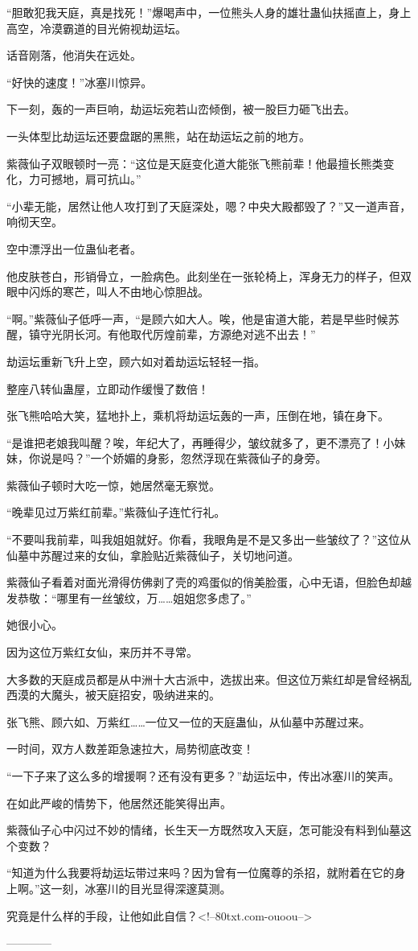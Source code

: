 \begin{this_body}
“胆敢犯我天庭，真是找死！”爆喝声中，一位熊头人身的雄壮蛊仙扶摇直上，身上高空，冷漠霸道的目光俯视劫运坛。

话音刚落，他消失在远处。

“好快的速度！”冰塞川惊异。

下一刻，轰的一声巨响，劫运坛宛若山峦倾倒，被一股巨力砸飞出去。

一头体型比劫运坛还要盘踞的黑熊，站在劫运坛之前的地方。

紫薇仙子双眼顿时一亮：“这位是天庭变化道大能张飞熊前辈！他最擅长熊类变化，力可撼地，肩可抗山。”

“小辈无能，居然让他人攻打到了天庭深处，嗯？中央大殿都毁了？”又一道声音，响彻天空。

空中漂浮出一位蛊仙老者。

他皮肤苍白，形销骨立，一脸病色。此刻坐在一张轮椅上，浑身无力的样子，但双眼中闪烁的寒芒，叫人不由地心惊胆战。

“啊。”紫薇仙子低呼一声，“是顾六如大人。唉，他是宙道大能，若是早些时候苏醒，镇守光阴长河。有他取代厉煌前辈，方源绝对逃不出去！”

劫运坛重新飞升上空，顾六如对着劫运坛轻轻一指。

整座八转仙蛊屋，立即动作缓慢了数倍！

张飞熊哈哈大笑，猛地扑上，乘机将劫运坛轰的一声，压倒在地，镇在身下。

“是谁把老娘我叫醒？唉，年纪大了，再睡得少，皱纹就多了，更不漂亮了！小妹妹，你说是吗？”一个娇媚的身影，忽然浮现在紫薇仙子的身旁。

紫薇仙子顿时大吃一惊，她居然毫无察觉。

“晚辈见过万紫红前辈。”紫薇仙子连忙行礼。

“不要叫我前辈，叫我姐姐就好。你看，我眼角是不是又多出一些皱纹了？”这位从仙墓中苏醒过来的女仙，拿脸贴近紫薇仙子，关切地问道。

紫薇仙子看着对面光滑得仿佛剥了壳的鸡蛋似的俏美脸蛋，心中无语，但脸色却越发恭敬：“哪里有一丝皱纹，万……姐姐您多虑了。”

她很小心。

因为这位万紫红女仙，来历并不寻常。

大多数的天庭成员都是从中洲十大古派中，选拔出来。但这位万紫红却是曾经祸乱西漠的大魔头，被天庭招安，吸纳进来的。

张飞熊、顾六如、万紫红……一位又一位的天庭蛊仙，从仙墓中苏醒过来。

一时间，双方人数差距急速拉大，局势彻底改变！

“一下子来了这么多的增援啊？还有没有更多？”劫运坛中，传出冰塞川的笑声。

在如此严峻的情势下，他居然还能笑得出声。

紫薇仙子心中闪过不妙的情绪，长生天一方既然攻入天庭，怎可能没有料到仙墓这个变数？

“知道为什么我要将劫运坛带过来吗？因为曾有一位魔尊的杀招，就附着在它的身上啊。”这一刻，冰塞川的目光显得深邃莫测。

究竟是什么样的手段，让他如此自信？<!--80txt.com-ouoou-->

------------

\end{this_body}

